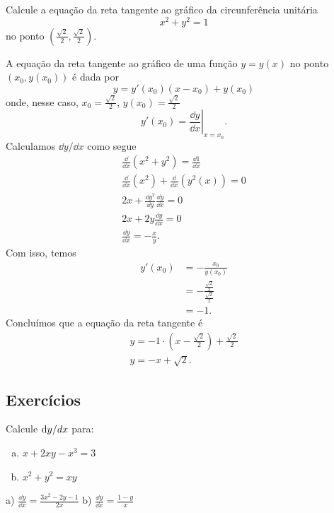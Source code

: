 \begin{exeresol}
  Calcule a equação da reta tangente ao gráfico da circunferência unitária
  \begin{equation}
    x^2 + y^2 = 1
  \end{equation}
  no ponto $\displaystyle\left(\frac{\sqrt{2}}{2}, \frac{\sqrt{2}}{2}\right)$.
\end{exeresol}
\begin{resol}
  A equação da reta tangente ao gráfico de uma função $y = y(x)$ no ponto $(x_0, y(x_0))$ é dada por
  \begin{equation}
    y = y'(x_0)(x - x_0) + y(x_0)
  \end{equation}
  onde, nesse caso, $\displaystyle x_0 = \frac{\sqrt{2}}{2}$, $\displaystyle y(x_0) = \frac{\sqrt{2}}{2}$
  \begin{equation}
    y'(x_0) = \left.\frac{\dd y}{\dd x}\right|_{x=x_0}.
  \end{equation}
  Calculamos $\dd y/\dd x$ como segue
  \begin{gather}
    \frac{\dd}{\dd x}\left(x^2+y^2\right) = \frac{\dd 1}{\dd x} \\
    \frac{\dd}{\dd x}\left(x^2\right) + \frac{\dd}{\dd x}\left(y^2(x)\right) = 0\\
    2x + \frac{\dd y^2}{\dd y}\frac{\dd y}{\dd x} = 0\\
    2x + 2y\frac{\dd y}{\dd x} = 0\\
    \frac{\dd y}{\dd x} = -\frac{x}{y}.
  \end{gather}
  Com isso, temos
  \begin{align}
    y'(x_0) &= -\frac{x_0}{y(x_0)}\\
            &= -\frac{\frac{\sqrt{2}}{2}}{\frac{\sqrt{2}}{2}}\\
            &= -1.
  \end{align}
  Concluímos que a equação da reta tangente é
  \begin{gather}
    y = -1\cdot \left(x - \frac{\sqrt{2}}{2}\right) + \frac{\sqrt{2}}{2}\\
    y = -x + \sqrt{2}.
  \end{gather}
\end{resol}

\subsection*{Exercícios}

\begin{exer}
  Calcule $\mathrm{d} y/\\d x$ para:
  \begin{enumerate}[a)]
  \item $x + 2xy - x^3 = 3$
  \item $x^2 + y^2 = xy$
  \end{enumerate}
\end{exer}
\begin{resp}
  a) $\displaystyle \frac{\dd y}{\dd x} = \frac{3x^2 - 2y - 1}{2x}$ b) $\displaystyle \frac{\dd y}{\dd x} = \frac{1 - y}{x}$
\end{resp}

